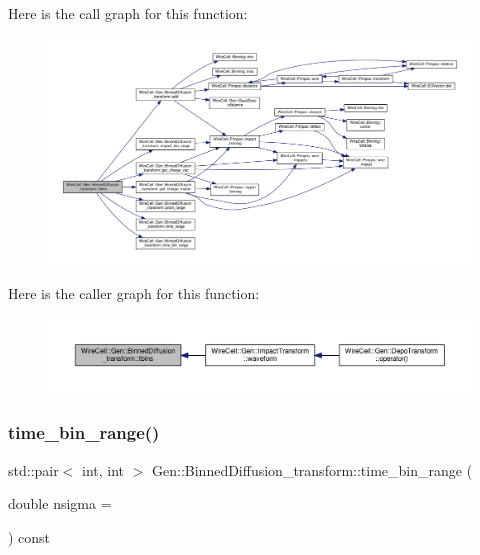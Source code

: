 Here is the call graph for this function\+:
\nopagebreak
\begin{figure}[H]
\begin{center}
\leavevmode
\includegraphics[width=350pt]{class_wire_cell_1_1_gen_1_1_binned_diffusion__transform_a57f26ea414abfae84cf54bdbe7992db5_cgraph}
\end{center}
\end{figure}
Here is the caller graph for this function\+:
\nopagebreak
\begin{figure}[H]
\begin{center}
\leavevmode
\includegraphics[width=350pt]{class_wire_cell_1_1_gen_1_1_binned_diffusion__transform_a57f26ea414abfae84cf54bdbe7992db5_icgraph}
\end{center}
\end{figure}
\mbox{\label{class_wire_cell_1_1_gen_1_1_binned_diffusion__transform_a8c66fd61a47999c36c8b00cafbe3fb87}} 
\subsubsection{\texorpdfstring{time\+\_\+bin\+\_\+range()}{time\_bin\_range()}}
{\footnotesize\ttfamily std\+::pair$<$ int, int $>$ Gen\+::\+Binned\+Diffusion\+\_\+transform\+::time\+\_\+bin\+\_\+range (\begin{DoxyParamCaption}\item[{double}]{nsigma = {} }\end{DoxyParamCaption}) const}

